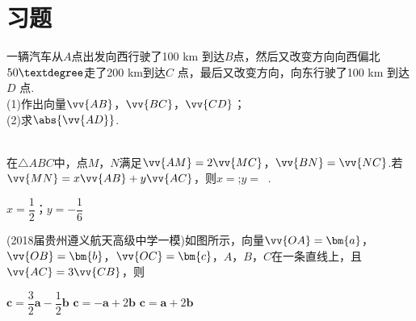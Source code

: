 \section{习题}
\begin{exercise}
  \item
    一辆汽车从$A $点出发向西行驶了100 km 到达$B $点，然后又改变方向向西偏北$50\textdegree$走了200 km到达$C$ 点，最后又改变方向，向东行驶了100 km 到达$D$ 点.\\
    (1)作出向量$\vv{AB}$，$\vv{BC}$，$\vv{CD}$；\\
    (2)求$\abs{\vv{AD}}$.\\
  \vspace{4cm}\\
  \begin{minipage}[b]{0.65\linewidth}
  \item
    在$\triangle ABC$中，点$ M$，$N $满足$ \vv{AM}=2\vv{MC}$，$\vv{BN}=\vv{NC}$.若$\vv{MN}=x\vv{AB}+y\vv{AC}$，则$ x= $\tk;$ y= ~$ \tk.
    \begin{answer}
      $x=\dfrac12$；$y=-\dfrac16$
    \end{answer}
  \end{minipage}
  \begin{minipage}[htbp!]{0.3\linewidth}
    \begin{center}
    \end{center}
  \end{minipage}
  \item
    (2018届贵州遵义航天高级中学一模)如图所示，向量$\vv{OA}=\bm{a}$，$\vv{OB}=\bm{b}$，$\vv{OC}=\bm{c}$，$A$，$B$，$C$在一条直线上，且$\vv{AC}=3\vv{CB}$，则\xz
    \begin{minipage}[b]{0.7\linewidth}
        {$\bm{c}=\dfrac32\bm{a}-\dfrac12\bm{b}$}
        {$\bm{c}=-\bm{a}+2\bm{b}$}
        {$\bm{c}=\bm{a}+2\bm{b}$}
    \end{minipage}\hfill
    \begin{minipage}[htbp!]{0.3\linewidth}
      \begin{center}
\end{center}
\end{minipage}
\end{exercise}
